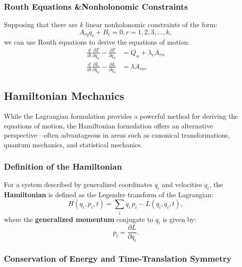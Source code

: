 \subsubsection{Routh Equations \&Nonholonomic Constraints}

Supposing that there are $k$ linear nonholonomic constraints of the form:
\begin{equation}
    A_{rq} \dot{q}_r + B_r = 0, r = 1, 2, 3, \dots, k,
\end{equation}
we can use Routh equations to derive the equations of motion:
\begin{align}
    \frac{d}{dt} \frac{\partial T}{\partial \dot{q}_\alpha} - \frac{\partial T}{\partial q_\alpha} & = Q_\alpha + \lambda_r A_{r \alpha} \\
    \frac{d}{dt} \frac{\partial L}{\partial \dot{q}_\alpha} - \frac{\partial L}{\partial q_\alpha} & = \lambda A_{r \alpha}.
\end{align}

\subsection{Hamiltonian Mechanics}

While the Lagrangian formulation provides a powerful method for deriving the equations of motion, the Hamiltonian formulation offers an alternative perspective—often advantageous in areas such as canonical transformations, quantum mechanics, and statistical mechanics.

\subsubsection{Definition of the Hamiltonian}

For a system described by generalized coordinates $q_i$ and velocities $\dot{q}_i$, the \textbf{Hamiltonian} is defined as the Legendre transform of the Lagrangian:
\begin{equation}
    H(q_i, p_i, t) = \sum_i \dot{q}_i\, p_i - L(q_i, \dot{q}_i, t),
\end{equation}
where the \textbf{generalized momentum} conjugate to $q_i$ is given by:
\begin{equation}
    p_i = \frac{\partial L}{\partial \dot{q}_i}.
\end{equation}

\subsubsection{Conservation of Energy and Time-Translation Symmetry}

